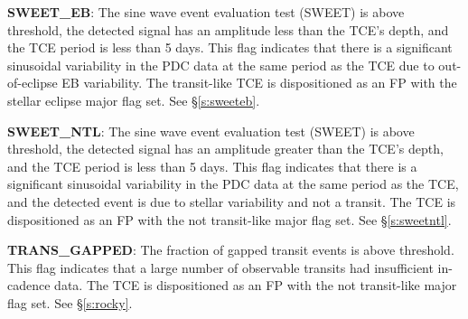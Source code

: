 
\textbf{SWEET\_EB}: The sine wave event evaluation test (SWEET) is above threshold, the detected signal has an amplitude less than the TCE's depth, and the TCE period is less than 5 days. This flag indicates that there is a significant sinusoidal variability in the PDC data at the same period as the TCE due to out-of-eclipse EB variability. The transit-like TCE is dispositioned as an FP with the stellar eclipse major flag set. See \S\ref{s:sweeteb}.

\textbf{SWEET\_NTL}: The sine wave event evaluation test (SWEET) is above threshold, the detected signal has an amplitude greater than the TCE's depth, and the TCE period is less than 5 days. This flag indicates that there is a significant sinusoidal variability in the PDC data at the same period as the TCE, and the detected event is due to stellar variability and not a transit. The TCE is dispositioned as an FP with the not transit-like major flag set. See \S\ref{s:sweetntl}.

\textbf{TRANS\_GAPPED}: The fraction of gapped transit events is above threshold. This flag indicates that a large number of observable transits had insufficient in-cadence data. The TCE is dispositioned as an FP with the not transit-like major flag set. See \S\ref{s:rocky}.
